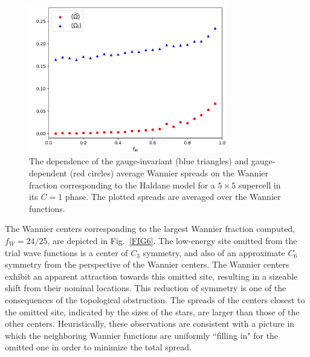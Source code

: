 \documentclass[galley,aps,pra,10pt,amsmath,amssymb,
    superscriptaddress,nofootinbib,longbibliography]{revtex4-2}
\begin{document}
\begin{figure}[t]
\begin{center}
\includegraphics[width=3.4in]{fig5.png}
\end{center}
\vspace{-5mm}
\caption{The dependence of the gauge-invariant (blue triangles) and gauge-dependent (red circles) average Wannier spreads on the Wannier fraction corresponding to the Haldane model for a $5\times 5$ supercell in its $C=1$ phase. The plotted spreads are averaged over the Wannier functions.}
\label{FIG5}
\end{figure}

The Wannier centers corresponding to the largest Wannier fraction computed, $f_W = 24/25$, are depicted in Fig.~\ref{FIG6}. The low-energy site omitted from the trial wave functions is a center of $C_3$ symmetry, and also of an approximate $C_6$ symmetry from the perspective of the Wannier centers. The Wannier centers exhibit an apparent attraction towards this omitted site, resulting in a sizeable shift from their nominal locations. This reduction of symmetry is one of the consequences of the topological obstruction. The spreads of the centers closest to the omitted site, indicated by the sizes of the stars, are larger than those of the other centers. Heuristically, these observations are consistent with a picture in which the neighboring Wannier functions are uniformly ``filling in" for the omitted one in order to minimize the total spread.  
\end{document}
